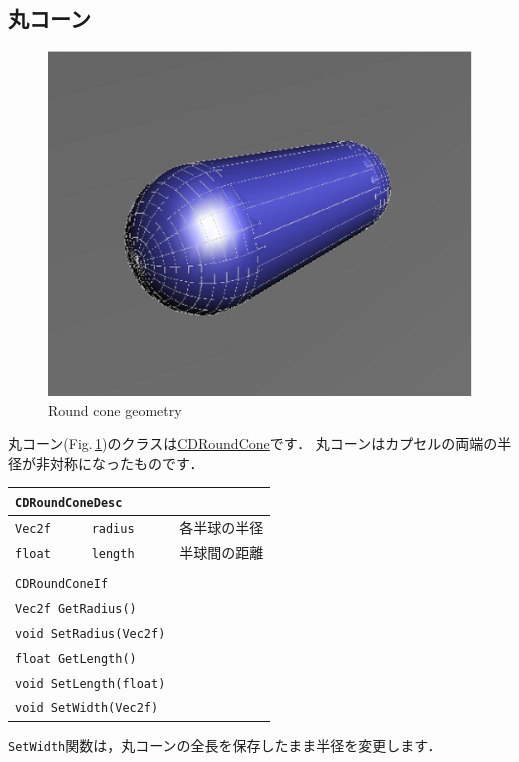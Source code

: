 \subsection*{\KLUDGE 丸コーン}

\begin{figure}[t]
\begin{center}
\includegraphics[width=.4\hsize]{fig/cdroundcone.eps}
\end{center}
\caption{Round cone geometry}
\label{fig_cdroundcone}
\end{figure}

\KLUDGE 丸コーン(Fig.\,\ref{fig_cdroundcone})\KLUDGE のクラスは\url{CDRoundCone}\KLUDGE です．
\KLUDGE 丸コーンはカプセルの両端の半径が非対称になったものです．

\begin{center}
\begin{tabular}{lll}
\multicolumn{3}{l}{\texttt{CDRoundConeDesc}}			\\ \midrule
\texttt{Vec2f}	&	\texttt{radius}	& \KLUDGE 各半球の半径		\\
\texttt{float}	&	\texttt{length} & \KLUDGE 半球間の距離		\\
\\
\multicolumn{3}{l}{\texttt{CDRoundConeIf}}				\\ \midrule
\multicolumn{2}{l}{\texttt{Vec2f GetRadius()}}			\\
\multicolumn{2}{l}{\texttt{void SetRadius(Vec2f)}}		\\
\multicolumn{2}{l}{\texttt{float GetLength()}}			\\
\multicolumn{2}{l}{\texttt{void SetLength(float)}}		\\
\multicolumn{2}{l}{\texttt{void SetWidth(Vec2f)}}		\\
\end{tabular}
\end{center}

\texttt{SetWidth}\KLUDGE 関数は，丸コーンの全長を保存したまま半径を変更します．


